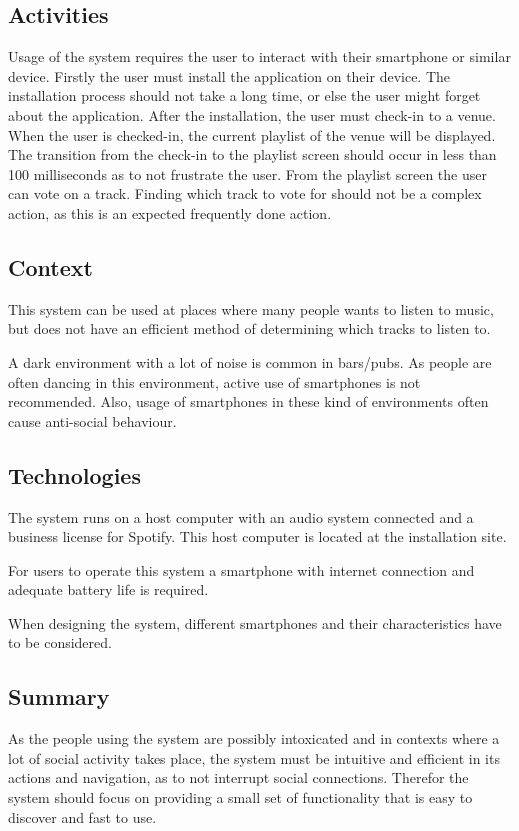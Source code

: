 \subsection{Activities}
\label{sub:pact_activities}

Usage of the system requires the user to interact with their smartphone or similar device. Firstly the user must install the application on their device. The installation process should not take a long time, or else the user might forget about the application. After the installation, the user must check-in to a venue. When the user is checked-in, the current playlist of the venue will be displayed. The transition from the check-in to the playlist screen should occur in less than 100 milliseconds as to not frustrate the user. From the playlist screen the user can vote on a track. Finding which track to vote for should not be a complex action, as this is an expected frequently done action.

\subsection{Context}
\label{sub:pact_context}

This system can be used at places where many people wants to listen to music, but does not have an efficient method of determining which tracks to listen to.

A dark environment with a lot of noise is common in bars/pubs. As people are often dancing in this environment, active use of smartphones is not recommended. Also, usage of smartphones in these kind of environments often cause anti-social behaviour.

\subsection{Technologies}
\label{sub:pact_technologies}

The system runs on a host computer with an audio system connected and a business license for Spotify. This host computer is located at the installation site.

For users to operate this system a smartphone with internet connection and adequate battery life is required.

When designing the system, different smartphones and their characteristics have to be considered.

\subsection{Summary}
\label{sec:pact_summary}

As the people using the system are possibly intoxicated and in contexts where a lot of social activity takes place, the system must be intuitive and efficient in its actions and navigation, as to not interrupt social connections. Therefor the system should focus on providing a small set of functionality that is easy to discover and fast to use.
